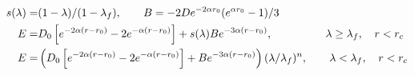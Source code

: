 \documentclass[12pt]{article}
\begin{document}
\begin{align*}
 s(\lambda) =& (1 - \lambda) / (1 - \lambda_f), \qquad B = -2D e^{-2 \alpha r_0} (e^{\alpha r_0} - 1) / 3 \\
  E =& D_0 \left[ e^{- 2 \alpha (r - r_0)} - 2 e^{- \alpha (r - r_0)} \right] +  s(\lambda) B e^{-3\alpha(r-r_0)}, \qquad \hspace{2.85em}\lambda \geq \lambda_f,\quad r < r_c \\
  E =& \left( D_0 \left[ e^{- 2 \alpha (r - r_0)} - 2 e^{- \alpha (r - r_0)} \right] + B e^{-3\alpha(r-r_0)} \right)(\lambda/\lambda_f)^n, \qquad \lambda < \lambda_f,\quad r < r_c
\end{align*}
\end{document}
